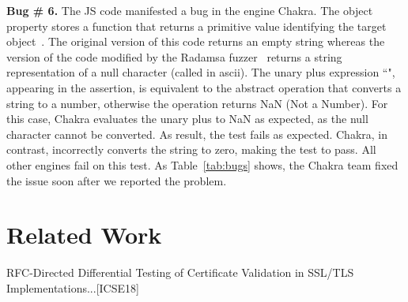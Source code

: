 \documentclass[10pt,conference,anonymous]{IEEEtran}
\begin{document}
 

\vspace{1ex}\noindent\textbf{Bug \# 6.} The JS code  
manifested a bug in the \js{} engine Chakra.  The object
property  stores a function that returns a primitive
value identifying the target object~\cite{valueof}. The original
version of this code returns an empty string whereas the version of
the code modified by the Radamsa fuzzer~\cite{radamsa} returns a string
representation of a null character (called  in ascii). The
unary plus expression ``", appearing in the assertion, is
equivalent to the abstract operation 
that converts a string to a number, otherwise the operation returns
NaN (Not a Number)\cite{unary-plus}. For this case, Chakra evaluates
the unary plus to NaN as expected, as the null character cannot be
converted. As result, the test fails as expected. Chakra, in contrast,
incorrectly converts the string to zero, making the test to pass. All
other engines fail on this test. As Table~\ref{tab:bugs} shows, the
Chakra team fixed the issue soon after we reported the problem.


\section{Related Work}


RFC-Directed Differential Testing of Certificate Validation in SSL/TLS Implementations...[ICSE18]


%


\end{document}
